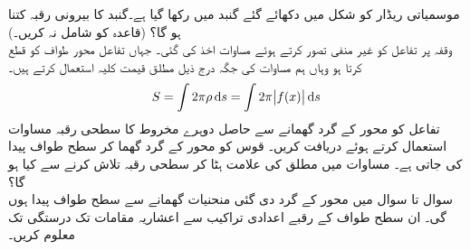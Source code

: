 موسمیاتی ریڈار کو شکل  میں دکھائے گئے  گنبد میں رکھا گیا ہے۔گنبد کا بیرونی رقبہ کتنا ہو گا؟ (قاعدہ  کو شامل نہ کریں۔)
\\
وقفہ  پر تفاعل  کو غیر منفی تصور کرتے ہوئے  مساوات  اخذ کی گئی۔ جہاں تفاعل محور طواف کو قطع کرتا ہو وہاں ہم مساوات  کی جگہ درج ذیل مطلق قیمت کلیہ استعمال کرتے ہیں۔
\begin{align}\label{مساوات_تکمل_استعمال_سطحی_رقبہ_ٹ}
S=\int 2\pi \rho \dif s=\int 2\pi \abs{f(x)}\dif s
\end{align}
تفاعل   کو محور  کے گرد گھمانے سے حاصل دوہرے مخروط کا سطحی رقبہ مساوات  استعمال کرتے ہوئے  دریافت کریں۔
قوس  کو محور  کے گرد گھما کر سطح طواف پیدا کی جاتی ہے۔ مساوات  میں مطلق کی علامت ہٹا کر سطحی رقبہ تلاش کرنے سے کیا ہو گا؟
\\
سوال  تا سوال  میں محور  کے گرد  دی گئی  منحنیات گھمانے سے سطح طواف پیدا ہوں گی۔ ان سطح طواف کے رقبے اعدادی تراکیب سے  اعشاریہ مقامات تک درستگی تک معلوم کریں۔

